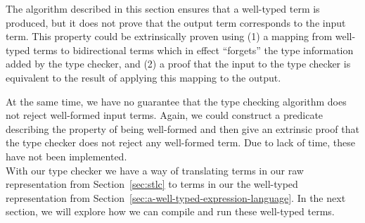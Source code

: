 The algorithm described in this section ensures that a well-typed term is produced, but it does not prove that the output term corresponds to the input term. This property could be extrinsically proven using (1) a mapping from well-typed terms to bidirectional terms which in effect ``forgets'' the type information added by the type checker, and (2) a proof that the input to the type checker is equivalent to the result of applying this mapping to the output.

At the same time, we have no guarantee that the type checking algorithm does not reject well-formed input terms. Again, we could construct a predicate describing the property of being well-formed and then give an extrinsic proof that the type checker does not reject any well-formed term. Due to lack of time, these have not been implemented.\\

With our type checker we have a way of translating terms in our raw representation from Section~\ref{sec:stlc} to terms in our the well-typed representation from Section~\ref{sec:a-well-typed-expression-language}. In the next section, we will explore how we can compile and run these well-typed terms.

